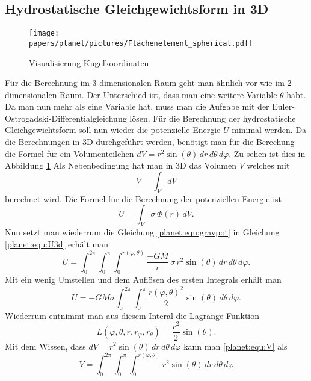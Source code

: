 \subsection{Hydrostatische Gleichgewichtsform in 3D}
\begin{figure}
	\centering
	\texttt{[image: papers/planet/pictures/Flächenelement\_spherical.pdf]}
	\caption{Visualisierung Kugelkoordinaten}
	\label{planet:fig:3d}
\end{figure}
Für die Berechnung im 3-dimensionalen Raum geht man ähnlich vor wie im 2-dimensionalen Raum.
Der Unterschied ist, dass man eine weitere Variable \(\theta\) habt.
Da man nun mehr als eine Variable hat, muss man die Aufgabe mit der Euler-Ostrogadski-Differentialgleichung lösen.
Für die Berechnung der hydrostatische Gleichgewichtsform soll nun wieder die potenzielle Energie \(U\) minimal werden.
Da die Berechnungen in 3D durchgeführt werden, benötigt man für die Berechung die Formel für ein Volumenteilchen \(dV = r^2 \sin (\theta) \, dr \, d\theta \, d\varphi \).
Zu sehen ist dies in Abbildung \ref{planet:fig:3d}
Als Nebenbedingung hat man in 3D das Volumen \(V\) welches mit 
\begin{equation}
	V = \int_{V}^{} dV
	\label{planet:equ:V}
\end{equation}
berechnet wird.
Die Formel für die Berechnung der potenziellen Energie ist
\begin{equation}
	U = \int_{V} \sigma \,  \Phi (r)\, dV.
	\label{planet:equ:U3d}
\end{equation}
Nun setzt man wiederrum die Gleichung \eqref{planet:equ:gravpot} in Gleichung \eqref{planet:equ:U3d} erhält man
\begin{equation*}
	U = \int_{0}^{2\pi}
	\int_{0}^{\pi}
	\int_{0}^{r(\varphi,\theta)}
	\frac{-GM}{r}\, \sigma\, r^2 \sin (\theta) \,
	dr \, d\theta \, d\varphi.
\end{equation*}
Mit ein wenig Umstellen und dem Auflösen des ersten Integrals erhält man
\begin{equation*}
	U =-GM\sigma \int_{0}^{2\pi}\int_{0}^{\pi}\frac{r(\varphi,\theta)^2}{2}  \sin (\theta) \, d\theta \, d\varphi.
\end{equation*}
Wiederrum entnimmt man aus diesem Interal die Lagrange-Funktion
\begin{equation*}
	L(\varphi,\theta ,r,r_\varphi,r_\theta) = \frac{r^2}{2}  \sin (\theta).
\end{equation*}
Mit dem Wissen, dass \(dV = r^2 \sin (\theta) \, dr \, d\theta \, d\varphi \) kann man \eqref{planet:equ:V} als
\begin{equation*}
	V = \int_{0}^{2\pi}\int_{0}^{\pi}\int_{0}^{r(\varphi,\theta)} r^2 \sin (\theta) \, dr \, d\theta \, d\varphi
\end{equation*}
